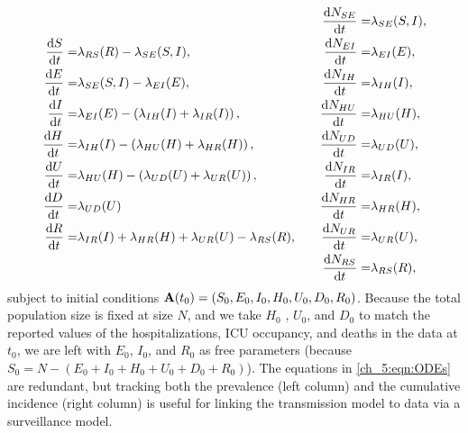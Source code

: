 \begin{equation}
\begin{aligned}
\frac{\mathrm{d} S}{\mathrm{d} t}    =&  \lambda_{RS}(R) - \lambda_{SE}(S, I), \\
\frac{\mathrm{d} E}{\mathrm{d} t}    =&  \lambda_{SE}(S, I) - \lambda_{EI}(E),    \\
\frac{\mathrm{d} I}{\mathrm{d} t}    =&  \lambda_{EI}(E) - \left( \lambda_{IH}(I) + \lambda_{IR}(I) \right),\\
\frac{\mathrm{d} H}{\mathrm{d} t}    =&  \lambda_{IH}(I) - \left( \lambda_{HU}(H) +  \lambda_{HR}(H) \right),\\
\frac{\mathrm{d} U}{\mathrm{d} t}    =&  \lambda_{HU}(H) - \left( \lambda_{UD}(U) + \lambda_{UR}(U) \right),\\
\frac{\mathrm{d} D}{\mathrm{d} t}    =&  \lambda_{UD}(U) \\
\frac{\mathrm{d} R}{\mathrm{d} t}    =&  \lambda_{IR}(I) + \lambda_{HR}(H) + \lambda_{UR}(U) - \lambda_{RS}(R),    \\
\end{aligned}
\qquad
\begin{aligned}
\frac{\mathrm{d} N_{SE}}{\mathrm{d} t}  =&  \lambda_{SE}(S, I), \\
\frac{\mathrm{d} N_{EI}}{\mathrm{d} t}  =&  \lambda_{EI}(E), \\
\frac{\mathrm{d} N_{IH}}{\mathrm{d} t}  =&  \lambda_{IH}(I), \\
\frac{\mathrm{d} N_{HU}}{\mathrm{d} t}  =&  \lambda_{HU}(H), \\
\frac{\mathrm{d} N_{UD}}{\mathrm{d} t}  =&  \lambda_{UD}(U), \\
\frac{\mathrm{d} N_{IR}}{\mathrm{d} t}  =&  \lambda_{IR}(I), \\
\frac{\mathrm{d} N_{HR}}{\mathrm{d} t}  =&  \lambda_{HR}(H), \\
\frac{\mathrm{d} N_{UR}}{\mathrm{d} t}  =&  \lambda_{UR}(U), \\
\frac{\mathrm{d} N_{RS}}{\mathrm{d} t}  =&  \lambda_{RS}(R),
\end{aligned}
\label{ch_5:eqn:ODEs}
\end{equation}
subject to initial conditions \( \mathbf{A}(t_0) = \left( S_0, E_0, I_0, H_0, U_0, D_0, R_0 \right) \).
Because the total population size is fixed at size \( N \), and we take \( H_0 \) , \( U_0 \), and \( D_0 \) to match the reported values of the hospitalizations, ICU occupancy, and deaths in the data at \( t_0 \), we are left with \( E_0 \), \( I_0 \), and \( R_0 \) as free parameters (because \( S_0 = N - \left( E_0 + I_0 + H_0 + U_0 + D_0 + R_0 \right) \)).
The equations in \eqref{ch_5:eqn:ODEs} are redundant, but tracking both the prevalence (left column) and the cumulative incidence (right column) is useful for linking the transmission model to data via a surveillance model.

